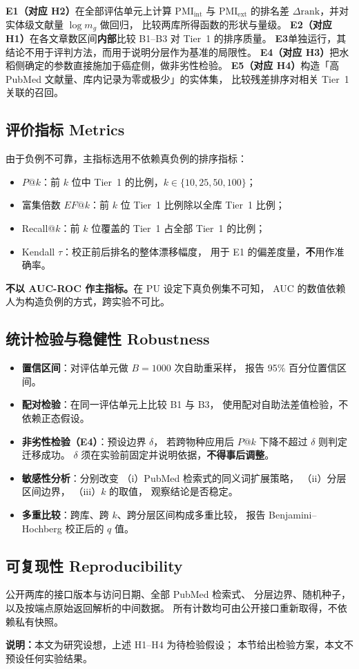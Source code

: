 \documentclass[conference]{IEEEtran}
\begin{document}
\textbf{E1（对应 H2）}在全部评估单元上计算
$\mathrm{PMI}_{\text{int}}$ 与 $\mathrm{PMI}_{\text{ext}}$ 的排名差
$\Delta\text{rank}$，并对实体级文献量 $\log m_g$ 做回归，
比较两库所得函数的形状与量级。
\textbf{E2（对应 H1）}在各文章数区间\textbf{内部}比较 B1--B3 对 Tier~1 的排序质量。
\textbf{E3}单独运行，其结论不用于评判方法，而用于说明分层作为基准的局限性。
\textbf{E4（对应 H3）}把水稻侧确定的参数直接施加于癌症侧，做非劣性检验。
\textbf{E5（对应 H4）}构造「高 PubMed 文献量、库内记录为零或极少」的实体集，
比较残差排序对相关 Tier~1 关联的召回。

\subsection{评价指标 Metrics}

由于负例不可靠，主指标选用不依赖真负例的排序指标：

\begin{itemize}
  \item $P@k$：前 $k$ 位中 Tier~1 的比例，$k\in\{10,25,50,100\}$；
  \item 富集倍数 $EF@k$：前 $k$ 位 Tier~1 比例除以全库 Tier~1 比例；
  \item Recall@$k$：前 $k$ 位覆盖的 Tier~1 占全部 Tier~1 的比例；
  \item Kendall $\tau$：校正前后排名的整体漂移幅度，
        用于 E1 的偏差度量，\textbf{不}用作准确率。
\end{itemize}

\textbf{不以 AUC-ROC 作主指标。}在 PU 设定下真负例集不可知，
AUC 的数值依赖人为构造负例的方式，跨实验不可比。

\subsection{统计检验与稳健性 Robustness}

\begin{itemize}
  \item \textbf{置信区间}：对评估单元做 $B=1000$ 次自助重采样，
        报告 95\% 百分位置信区间。
  \item \textbf{配对检验}：在同一评估单元上比较 B1 与 B3，
        使用配对自助法差值检验，不依赖正态假设。
  \item \textbf{非劣性检验（E4）}：预设边界 $\delta$，
        若跨物种应用后 $P@k$ 下降不超过 $\delta$ 则判定迁移成功。
        $\delta$ 须在实验前固定并说明依据，\textbf{不得事后调整}。
  \item \textbf{敏感性分析}：分别改变
        （i）PubMed 检索式的同义词扩展策略，
        （ii）分层区间边界，
        （iii）$k$ 的取值，
        观察结论是否稳定。
  \item \textbf{多重比较}：跨库、跨 $k$、跨分层区间构成多重比较，
        报告 Benjamini--Hochberg 校正后的 $q$ 值。
\end{itemize}

\subsection{可复现性 Reproducibility}

公开两库的接口版本与访问日期、全部 PubMed 检索式、
分层边界、随机种子，以及按端点原始返回解析的中间数据。
所有计数均可由公开接口重新取得，不依赖私有快照。

\textbf{说明：}本文为研究设想，上述 H1--H4 为待检验假设；
本节给出检验方案，本文不预设任何实验结果。
\end{document}
